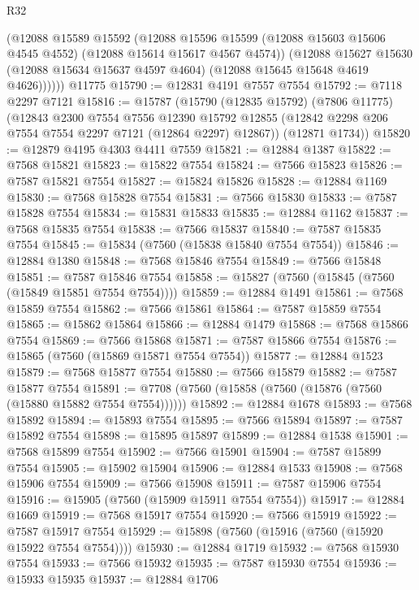 \begin{lexlean}{R32}
\begin{coremodule}
          (@12088
            @15589
            @15592
            (@12088
              @15596
              @15599
              (@12088 @15603 @15606 @4545 @4552)
              (@12088 @15614 @15617 @4567 @4574))
            (@12088
              @15627
              @15630
              (@12088 @15634 @15637 @4597 @4604)
              (@12088 @15645 @15648 @4619 @4626))))))
    @11775
@15790 := @12831 @4191 @7557 @7554
@15792 := @7118 @2297 @7121
@15816 := @15787
    (@15790
      (@12835 @15792)
      (@7806 @11775)
      (@12843
        @2300
        @7554
        @7556
        @12390
        @15792
        @12855
        (@12842 @2298 @206 @7554 @7554 @2297 @7121 (@12864 @2297) @12867))
      (@12871 @1734))
@15820 := @12879 @4195 @4303 @4411 @7559
@15821 := @12884 @1387
@15822 := @7568 @15821
@15823 := @15822 @7554
@15824 := @7566 @15823
@15826 := @7587 @15821 @7554
@15827 := @15824 @15826
@15828 := @12884 @1169
@15830 := @7568 @15828 @7554
@15831 := @7566 @15830
@15833 := @7587 @15828 @7554
@15834 := @15831 @15833
@15835 := @12884 @1162
@15837 := @7568 @15835 @7554
@15838 := @7566 @15837
@15840 := @7587 @15835 @7554
@15845 := @15834 (@7560 (@15838 @15840 @7554 @7554))
@15846 := @12884 @1380
@15848 := @7568 @15846 @7554
@15849 := @7566 @15848
@15851 := @7587 @15846 @7554
@15858 := @15827 (@7560 (@15845 (@7560 (@15849 @15851 @7554 @7554))))
@15859 := @12884 @1491
@15861 := @7568 @15859 @7554
@15862 := @7566 @15861
@15864 := @7587 @15859 @7554
@15865 := @15862 @15864
@15866 := @12884 @1479
@15868 := @7568 @15866 @7554
@15869 := @7566 @15868
@15871 := @7587 @15866 @7554
@15876 := @15865 (@7560 (@15869 @15871 @7554 @7554))
@15877 := @12884 @1523
@15879 := @7568 @15877 @7554
@15880 := @7566 @15879
@15882 := @7587 @15877 @7554
@15891 := @7708 (@7560 (@15858 (@7560 (@15876 (@7560 (@15880 @15882 @7554 @7554))))))
@15892 := @12884 @1678
@15893 := @7568 @15892
@15894 := @15893 @7554
@15895 := @7566 @15894
@15897 := @7587 @15892 @7554
@15898 := @15895 @15897
@15899 := @12884 @1538
@15901 := @7568 @15899 @7554
@15902 := @7566 @15901
@15904 := @7587 @15899 @7554
@15905 := @15902 @15904
@15906 := @12884 @1533
@15908 := @7568 @15906 @7554
@15909 := @7566 @15908
@15911 := @7587 @15906 @7554
@15916 := @15905 (@7560 (@15909 @15911 @7554 @7554))
@15917 := @12884 @1669
@15919 := @7568 @15917 @7554
@15920 := @7566 @15919
@15922 := @7587 @15917 @7554
@15929 := @15898 (@7560 (@15916 (@7560 (@15920 @15922 @7554 @7554))))
@15930 := @12884 @1719
@15932 := @7568 @15930 @7554
@15933 := @7566 @15932
@15935 := @7587 @15930 @7554
@15936 := @15933 @15935
@15937 := @12884 @1706

\end{coremodule}
\end{lexlean}

